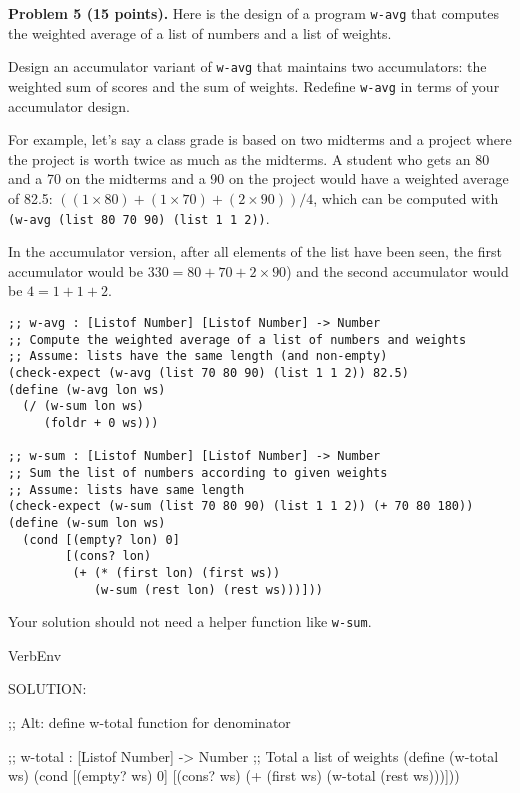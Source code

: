 \documentclass[12pt]{article}
\begin{document}
\newpage

\noindent
{\bf Problem 5 (15 points).}
%
Here is the design of a program {\tt w-avg} that computes the weighted
average of a list of numbers and a list of weights.

Design an accumulator variant of {\tt w-avg} that maintains two
accumulators: the weighted sum of scores and the sum of weights.
Redefine {\tt w-avg} in terms of your accumulator design.

For example, let's say a class grade is based on two midterms and a
project where the project is worth twice as much as the midterms.  A
student who gets an 80 and a 70 on the midterms and a 90 on the
project would have a weighted average of 82.5: $((1 \times 80) + (1
\times 70) + (2 \times 90)) / 4$, which can be computed with {\tt
  (w-avg (list 80 70 90) (list 1 1 2))}.

In the accumulator version, after all elements of the list have been
seen, the first accumulator would be $330 = 80+70+2\times 90$) and
the second accumulator would be $4 =1+1+2$.

\begin{verbatim}
;; w-avg : [Listof Number] [Listof Number] -> Number
;; Compute the weighted average of a list of numbers and weights
;; Assume: lists have the same length (and non-empty)
(check-expect (w-avg (list 70 80 90) (list 1 1 2)) 82.5)
(define (w-avg lon ws)
  (/ (w-sum lon ws) 
     (foldr + 0 ws)))

;; w-sum : [Listof Number] [Listof Number] -> Number
;; Sum the list of numbers according to given weights
;; Assume: lists have same length
(check-expect (w-sum (list 70 80 90) (list 1 1 2)) (+ 70 80 180))
(define (w-sum lon ws)
  (cond [(empty? lon) 0]
        [(cons? lon)
         (+ (* (first lon) (first ws))
            (w-sum (rest lon) (rest ws)))]))
\end{verbatim}

\noindent
Your solution should not need a helper function like {\tt w-sum}.

\begin{SaveVerbatim}{VerbEnv}


SOLUTION:


;; Alt: define w-total function for denominator

;; w-total : [Listof Number] -> Number
;; Total a list of weights
(define (w-total ws)
  (cond [(empty? ws) 0]
        [(cons? ws)
         (+ (first ws) 
            (w-total (rest ws)))]))
\end{SaveVerbatim}
\end{document}
